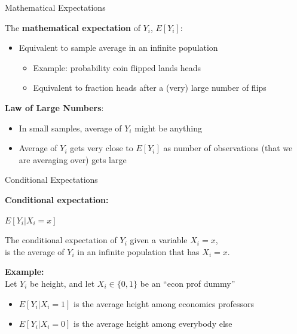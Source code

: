 \documentclass[10pt,xcolor=table,ignorenonframetext,handout,aspectratio=169]{beamer}
\newlength{\wideitemsep}
\let\olditem\item
\renewcommand{\item}{\setlength{\itemsep}{\wideitemsep}\olditem}
\begin{document}
\begin{frame}{Mathematical Expectations}

\medskip
The \textbf{mathematical expectation} of $Y_i$, $E [ Y_i ]$:

\medskip
\begin{itemize}
	
	\item Equivalent to sample average in an infinite population
	
	\medskip
	\begin{itemize}
		
		\item Example:  probability coin flipped lands heads
		
		\item Equivalent to fraction heads after a (very) large number of flips
		
	\end{itemize}
	
\end{itemize}

\pause
\medskip
\textbf{Law of Large Numbers}:

\medskip
\begin{itemize}
	
	\item In small samples, average of $Y_i$ might be anything
	
	\item Average of $Y_i$ gets very close to $E [ Y_i ]$ 
	as number of observations (that we are averaging over) gets large
	
\end{itemize}

\end{frame}



\begin{frame}{Conditional Expectations}

\medskip
\textbf{Conditional expectation:}

\medskip
$E [ Y_i \vert X_i = x]$

\medskip
The conditional expectation of $Y_i$ given a variable $X_i=x$, \\
is the average of $Y_i$ in an infinite population that has $X_i=x$.

\pause
\medskip
\medskip
\textbf{Example:}  \\
Let $Y_i$ be height, and let $X_i \in \{ 0 ,1 \}$ be an ``econ prof dummy''

\medskip
\begin{itemize}
	
	\item 
	$E [ Y_i \vert X_i = 1]$ is the average height among economics professors
	
	\item 
	$E [ Y_i \vert X_i = 0]$ is the average height among everybody else
	
\end{itemize}

\end{frame}
\end{document}
